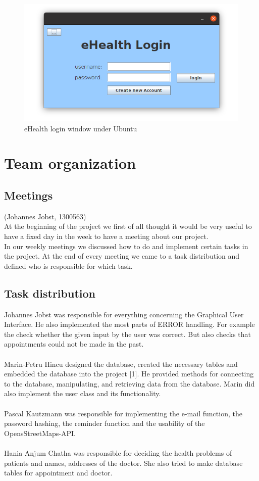 \documentclass[a4paper, 12pt]{report}
\begin{document}
\begin{figure}[!h]
\includegraphics[width=\linewidth]{login.jpg} 
\caption{eHealth login window under Ubuntu}
\end{figure}

\chapter{Team organization}
\section{Meetings}
{\tiny (Johannes Jobst, 1300563)\\}
At the beginning of the project we first of all thought it would be very useful 
to have a fixed day in the week to have a meeting about our project. \\
In our weekly meetings we discussed how to do and implement certain tasks in the project.
At the end of every meeting we came to a task distribution and defined who is
responsible for which task. 

\section{Task distribution}
Johannes Jobst was responsible for everything concerning the Graphical User Interface.
He also implemented the most parts of ERROR handling. For example the check whether the given
input by the user was correct. But also checks that appointments could not be made in the past. \\ \\
Marin-Petru Hincu designed the database, created the necessary tables and embedded the database into the project [1]. He provided methods for connecting to the database, manipulating, and retrieving data from the database. Marin did also implement the user class and its functionality. \\ \\
Pascal Kautzmann was responsible for implementing the e-mail function, the password hashing, the reminder function and the usability of the OpensStreetMaps-API. \\ 
	\\
Hania Anjum Chatha was responsible for deciding the health problems of patients and names, addresses of the doctor. She also tried to make database tables for appointment and doctor.
\end{document}
